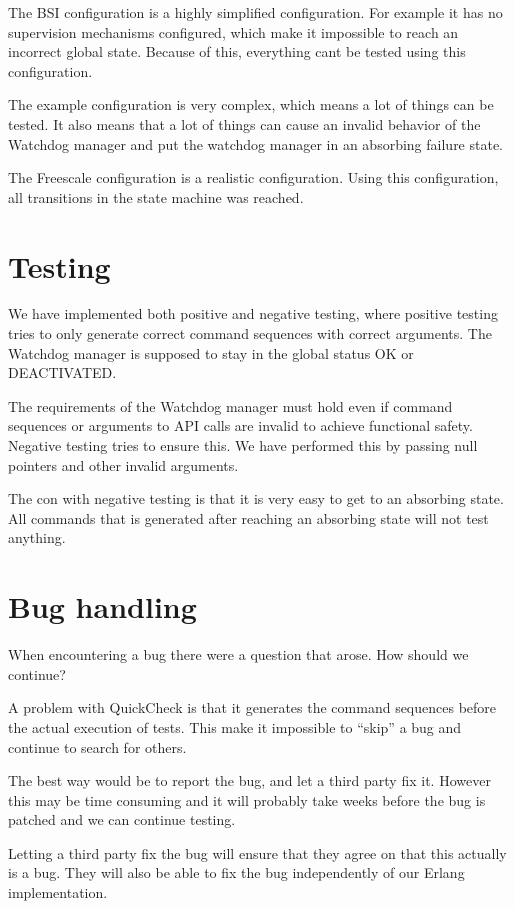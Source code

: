 \documentclass[a4paper]{article}
\begin{document}
The BSI configuration is a highly simplified configuration. For
example it has no supervision mechanisms configured, which make it
impossible to reach an incorrect global state.
Because of this, everything cant be tested using this configuration.

The example configuration is very complex, which means a lot of things
can be tested. It also means that a lot of things can cause an invalid
behavior of the Watchdog manager and put the watchdog manager in an
absorbing failure state.

The Freescale configuration is a realistic configuration.
Using this configuration, all transitions in the state machine was reached.

\section{Testing}
We have implemented both positive and negative testing, where positive
testing tries to only generate correct command sequences with correct
arguments. The Watchdog manager is supposed to stay in the global
status OK or DEACTIVATED.

The requirements of the Watchdog manager must hold even if command
sequences or arguments to API calls are invalid to achieve functional
safety. Negative testing tries to ensure this. We have performed this
by passing null pointers and other invalid arguments.

The con with negative testing is that it is very easy to get to an
absorbing state. All commands that is generated after reaching an
absorbing state will not test anything.

\section{Bug handling}
When encountering a bug there were a question that arose. How should
we continue?

A problem with QuickCheck is that it generates the command sequences
before the actual execution of tests. This make it impossible to
``skip'' a bug and continue to search for others.

The best way would be to report the bug, and let a third party fix
it. However this may be time consuming and it will probably take weeks
before the bug is patched and we can continue testing.

Letting a third party fix the bug will ensure that they agree on that
this actually is a bug. They will also be able to fix the bug
independently of our Erlang implementation.
\end{document}
